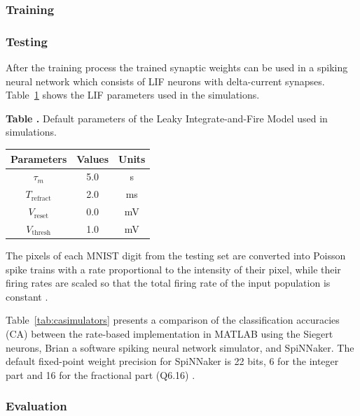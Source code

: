 \subsubsection{Training}
\citet{10.3389/fnins.2013.00178}
\subsubsection{Testing}
After the training process the trained synaptic weights can be used in a spiking neural network which consists of LIF neurons with delta-current synapses. Table~\ref{Tab:NeuralParams} shows the LIF parameters used in the simulations.

\begin{table}[htb!]
\textbf{\label{Tab:NeuralParams} Table .}{ Default parameters of the Leaky Integrate-and-Fire Model used in simulations.}

\processtable{}
{\begin{tabular}{c|c|c} %
Parameters & Values & Units \\
\hline
$\tau_{m}$ 		 & 5.0 & s  \\
$T_{\mathrm{refract}}$ & 2.0 & ms \\
$V_{\mathrm{reset}}$ 		 & 0.0 & mV \\
$V_{\mathrm{thresh}}$ 		 & 1.0 & mV \\
\end{tabular}}{}
\end{table}


The pixels of each MNIST digit from the testing set are converted into Poisson spike trains with a rate proportional to the intensity of their pixel, while their firing rates are scaled so that the total firing rate of the input population is constant \citep{10.3389/fnins.2013.00178}.

 
Table~\ref{tab:casimulators} presents a comparison of the classification accuracies (CA) between the rate-based implementation in MATLAB using the Siegert neurons, Brian \citep{} a software spiking neural network simulator, and SpiNNaker. The default fixed-point weight precision for SpiNNaker is 22 bits, 6 for the integer part and 16 for the fractional part (Q6.16) \citep{}.





\subsubsection{Evaluation}

